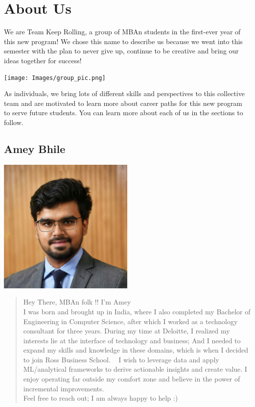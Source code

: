 \documentclass[
]{book}
\begin{document}
\hypertarget{about-us}{%
\chapter{About Us}\label{about-us}}

We are Team Keep Rolling, a group of MBAn students in the first-ever year of this new program! We chose this name to describe us because we went into this semester with the plan to never give up, continue to be creative and bring our ideas together for success!

\texttt{[image: Images/group\_pic.png]}

As individuals, we bring lots of different skills and perspectives to this collective team and are motivated to learn more about career paths for this new program to serve future students. You can learn more about each of us in the sections to follow.

\hypertarget{amey-bhile}{%
\section{Amey Bhile}\label{amey-bhile}}

\includegraphics[width=0.5\textwidth,height=\textheight]{Images/Amey.jpeg}

\begin{quote}
Hey There, MBAn folk !! I'm Amey\\
I was born and brought up in India, where I also completed my Bachelor of Engineering in Computer Science, after which I worked as a technology consultant for three years. During my time at Deloitte, I realized my interests lie at the interface of technology and business; And I needed to expand my skills and knowledge in these domains, which is when I decided to join Ross Business School. ~
I wish to leverage data and apply ML/analytical frameworks to derive actionable insights and create value. I enjoy operating far outside my comfort zone and believe in the power of incremental improvements.\\
Feel free to reach out; I am always happy to help :)
\end{quote}
\end{document}
